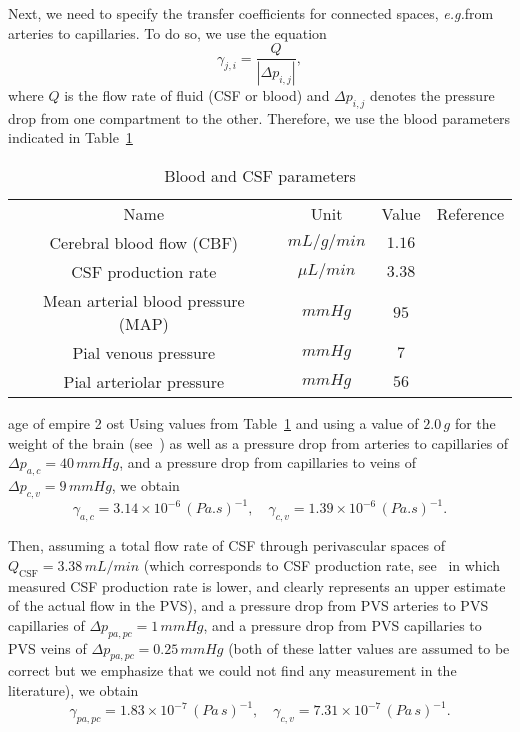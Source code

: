 \documentclass[10pt]{article}
\newcommand{\eg}{\emph{e.g.}\;}
\newcommand{\1}{^{(1)}}
\newcommand{\2}{^{(2)}}
\newcommand{\abs}[1]{\left\lvert#1\right\rvert}
\begin{document}
%     

Next, we need to specify the transfer coefficients for connected spaces, \eg from arteries to capillaries. To do so, we use the equation
\[
    \gamma_{j,i} = \frac{Q}{\abs{\Delta p_{i,j}}}, 
\]
where $Q$ is the flow rate of fluid (CSF or blood) and $\Delta p_{i,j}$ denotes the pressure drop from one compartment to the other. 
Therefore, we use the blood parameters indicated in Table~\ref{tab:bloodparam}
\begin{table}[!h]
    \centering
    \begin{tabular}{c|c|c|c}
        Name & Unit & Value & Reference \\
        Cerebral blood flow (CBF) & $\si{mL/g/min}$ & $1.16$ & \cite{Larkin}\\
        CSF production rate & $\si{\mu L/min}$ & $3.38$ & \cite{CHODOBSKI1998205}\\
        Mean arterial blood pressure (MAP) & $\si{mmHg}$ & $95$ & \cite{dai2016high}\\
        Pial venous pressure & $\si{mmHg}$ & $7$& \cite{mayhan_role_1986} \\
        Pial arteriolar pressure & $\si{mmHg}$ & $56$ & \cite{mayhan_role_1986,Baumbach}\\
        
    \end{tabular}
    \caption{Blood and CSF parameters}
    \label{tab:bloodparam}
\end{table}

age of empire 2 ost Using values from Table~\ref{tab:bloodparam} and using a value of $2.0\,\si{g}$ for the weight of the brain (see~\cite{piao2013change}) as well as a pressure drop from arteries to capillaries of $\Delta p_{a,c} = 40 \,\si{mmHg}$, and a pressure drop from capillaries to veins of $\Delta p_{c,v} = 9\, \si{mmHg}$, we obtain 
\[
    \gamma_{a,c} = 3.14 \times 10^{-6} \, \si{(Pa.s)^{-1}},\quad \gamma_{c,v} = 1.39  \times 10^{-6}\, \si{(Pa.s)^{-1}}.
\]

Then, assuming a total flow rate of CSF through perivascular spaces of  $Q_\text{CSF} = 3.38 \,\si{mL/min}$ (which corresponds to CSF production rate, see~\cite{KARIMY201578} in which measured CSF production rate is lower, and clearly represents an upper estimate of the actual flow in the PVS), and a pressure drop from PVS arteries to PVS capillaries of $\Delta p_{pa,pc} = 1 \, \si{mmHg}$, and a  pressure drop from PVS capillaries to PVS veins of $\Delta p_{pa,pc} = 0.25 \, \si{mmHg}$ (both of these latter values are assumed to be correct but we emphasize that we could not find any measurement in the literature), we obtain 
\[
    \gamma_{pa,pc} = 1.83 \times 10^{-7}\, \si{(Pa\,s)^{-1}},\quad \gamma_{c,v} = 7.31  \times 10^{-7}\, \si{(Pa\,s)^{-1}}.
\]
\end{document}
